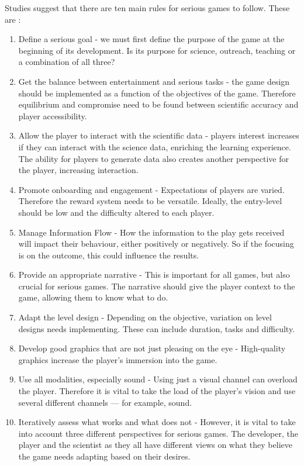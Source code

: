 		Studies suggest that there are ten main rules for serious games to follow. These are \cite{10seriousrules}:
		\begin{enumerate}		
			\item Define a serious goal - we must first define the purpose of the game at the beginning of its development. Is its purpose for science, outreach, teaching or a combination of all three? 
			\item Get the balance between entertainment and serious tasks - the game design should be implemented as a function of the objectives of the game. Therefore equilibrium and compromise need to be found between scientific accuracy and player accessibility.
			\item Allow the player to interact with the scientific data - players interest increases if they can interact with the science data, enriching the learning experience. The ability for players to generate data also creates another perspective for the player, increasing interaction.
			\item Promote onboarding and engagement - Expectations of players are varied. Therefore the reward system needs to be versatile. Ideally, the entry-level should be low and the difficulty altered to each player.
			\item Manage Information Flow - How the information to the play gets received will impact their behaviour, either positively or negatively. So if the focusing is on the outcome, this could influence the results.
			\item Provide an appropriate narrative - This is important for all games, but also crucial for serious games. The narrative should give the player context to the game, allowing them to know what to do. 
			\item Adapt the level design - Depending on the objective, variation on level designs needs implementing. These can include duration, tasks and difficulty. 
			\item Develop good graphics that are not just pleasing on the eye - High-quality graphics increase the player's immersion into the game.
			\item Use all modalities, especially sound - Using just a visual channel can overload the player. Therefore it is vital to take the load of the player's vision and use several different channels — for example, sound.
			\item Iteratively assess what works and what does not - However, it is vital to take into account three different perspectives for serious games. The developer, the player and the scientist as they all have different views on what they believe the game needs adapting based on their desires.
		\end{enumerate}
	
